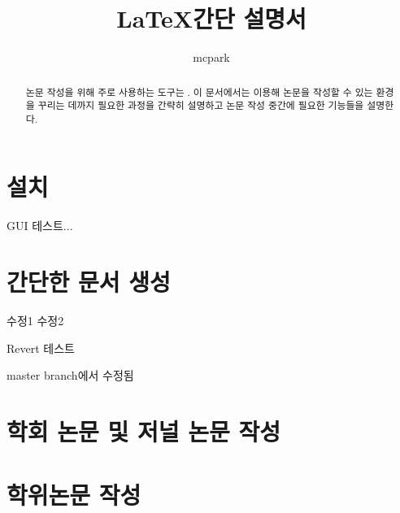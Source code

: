 \documentclass[a4paper, nobookmarks, subfigure, adjustmath, amsmath]{oblivoir}
\title{\LaTeX 간단 설명서}
\author{mcpark}
\begin{document}
\maketitle
\begin{abstract}
논문 작성을 위해 주로 사용하는 도구는 .
이 문서에서는  이용해 논문을 작성할 수 있는 환경을 꾸리는 데까지 필요한 과정을 간략히 설명하고 논문 작성 중간에 필요한  기능들을 설명한다.
\end{abstract}

\section{설치}
GUI 테스트...


\section{간단한 문서 생성}
수정1
수정2

Revert 테스트


master branch에서 수정됨
\section{학회 논문 및 저널 논문 작성}


\section{학위논문 작성}
\end{document}
